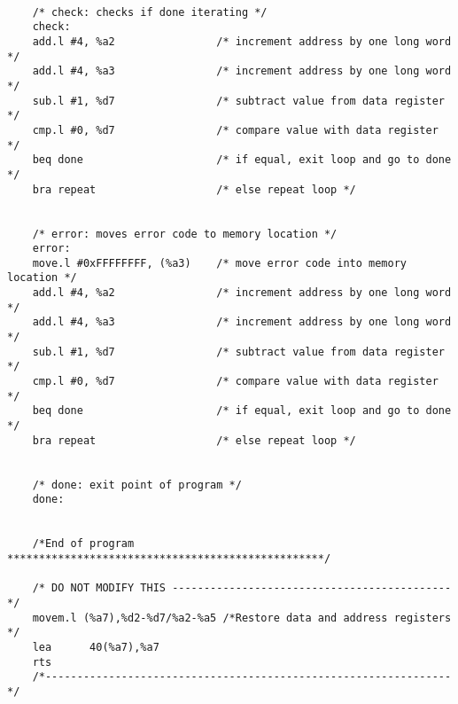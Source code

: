 \documentclass[10pt, letterpaper, titlepage]{article} %
\begin{document}
\begin{lstlisting}
	
	/* check: checks if done iterating */
	check:
	add.l #4, %a2                /* increment address by one long word */
	add.l #4, %a3                /* increment address by one long word */
	sub.l #1, %d7                /* subtract value from data register */
	cmp.l #0, %d7                /* compare value with data register */
	beq done                     /* if equal, exit loop and go to done */
	bra repeat                   /* else repeat loop */
	
	
	/* error: moves error code to memory location */
	error:
	move.l #0xFFFFFFFF, (%a3)    /* move error code into memory location */
	add.l #4, %a2                /* increment address by one long word */
	add.l #4, %a3                /* increment address by one long word */
	sub.l #1, %d7                /* subtract value from data register */
	cmp.l #0, %d7                /* compare value with data register */
	beq done                     /* if equal, exit loop and go to done */
	bra repeat                   /* else repeat loop */
	
	
	/* done: exit point of program */
	done:
	
	
	/*End of program **************************************************/
	
	/* DO NOT MODIFY THIS --------------------------------------------*/
	movem.l (%a7),%d2-%d7/%a2-%a5 /*Restore data and address registers */
	lea      40(%a7),%a7
	rts
	/*----------------------------------------------------------------*/
\end{lstlisting}
\end{document}
